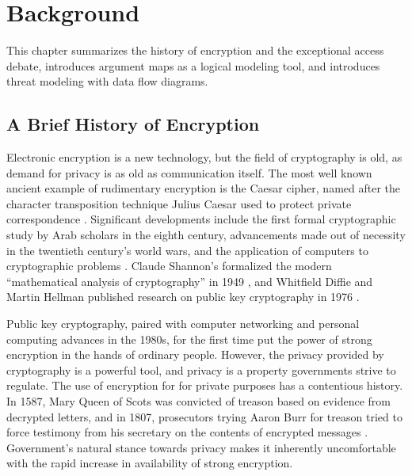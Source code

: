 \chapter{Background}
\label{chap-background}

This chapter summarizes the history of encryption and the exceptional access debate, introduces argument maps as a
logical modeling tool, and introduces threat modeling with data flow diagrams.

\section{A Brief History of Encryption}
\label{sec-history}

Electronic encryption is a new technology, but the field of cryptography is old, as demand for privacy is as old as
communication itself. The most well known ancient example of rudimentary encryption is the Caesar cipher, named after
the character transposition technique Julius Caesar used to protect private correspondence
\cite{luciano_cryptology_1987}. Significant developments include the first formal cryptographic study by Arab scholars
in the eighth century, advancements made out of necessity in the twentieth century's world wars, and the application of
computers to cryptographic problems \cite{kahn_codebreakers_1996}. Claude Shannon's formalized the modern ``mathematical
analysis of cryptography'' in 1949 \cite{shannon_communication_1949}, and Whitfield Diffie and Martin Hellman published
research on public key cryptography in 1976 \cite{diffie_new_1976}.

Public key cryptography, paired with computer networking and personal computing advances in the 1980s, for the first
time put the power of strong encryption in the hands of ordinary people. However, the privacy provided by cryptography
is a powerful tool, and privacy is a property governments strive to regulate. The use of encryption for for private
purposes has a contentious history. In 1587, Mary Queen of Scots was convicted of treason based on evidence from
decrypted letters, and in 1807, prosecutors trying Aaron Burr for treason tried to force testimony from his secretary on
the contents of encrypted messages \cite{kerr_encryption_2017}. Government's natural stance towards privacy makes it
inherently uncomfortable with the rapid increase in availability of strong encryption.


